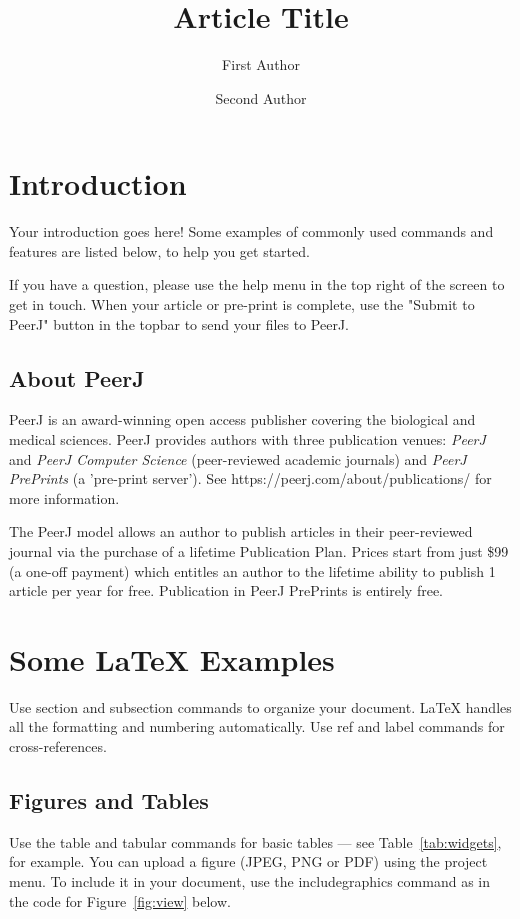 \documentclass[fleqn,10pt,lineno]{wlpeerj} %
\title{Article Title}
\author[1]{First Author}
\author[2]{Second Author}
\affil[1]{Address of first author}
\affil[2]{Address of second author}
\begin{document}
\flushbottom
\maketitle
\thispagestyle{empty}

\section*{Introduction}

Your introduction goes here! Some examples of commonly used commands and features are listed below, to help you get started.

If you have a question, please use the help menu in the top right of the screen to get in touch. When your article or pre-print is complete, use the "Submit to PeerJ" button in the topbar to send your files to PeerJ.

\subsection*{About PeerJ}

PeerJ is an award-winning open access publisher covering the biological and medical sciences.  PeerJ provides authors with three publication venues: \textit{PeerJ} and \textit{PeerJ Computer Science} (peer-reviewed academic journals) and \textit{PeerJ PrePrints} (a 'pre-print server'). See https://peerj.com/about/publications/ for more information.

The PeerJ model allows an author to publish articles in their peer-reviewed journal via the purchase of a lifetime Publication Plan. Prices start from just \$99 (a one-off payment) which entitles an author to the lifetime ability to publish 1 article per year for free. Publication in PeerJ PrePrints is entirely free.

\section*{Some \LaTeX{} Examples}
\label{sec:examples}

Use section and subsection commands to organize your document. \LaTeX{} handles all the formatting and numbering automatically. Use ref and label commands for cross-references.

\subsection*{Figures and Tables}

Use the table and tabular commands for basic tables --- see Table~\ref{tab:widgets}, for example. You can upload a figure (JPEG, PNG or PDF) using the project menu. To include it in your document, use the includegraphics command as in the code for Figure~\ref{fig:view} below.
\end{document}
